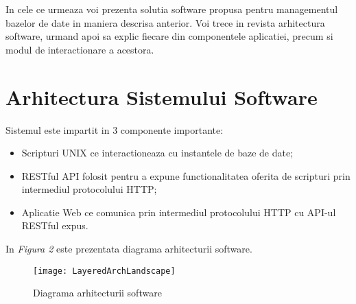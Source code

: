 In cele ce urmeaza voi prezenta solutia software propusa pentru managementul bazelor de date in maniera descrisa anterior. Voi trece in revista arhitectura software, urmand apoi sa explic fiecare din componentele aplicatiei, precum si modul de interactionare a acestora.
\\

\section{Arhitectura Sistemului Software}
Sistemul este impartit in 3 componente importante:
\begin{itemize}
\item Scripturi UNIX ce interactioneaza cu instantele de baze de date;
\item RESTful API folosit pentru a expune functionalitatea oferita de scripturi prin intermediul protocolului HTTP;
\item Aplicatie Web ce comunica prin intermediul protocolului HTTP cu API-ul RESTful expus.
\end{itemize}
In \textit{Figura 2} este prezentata diagrama arhitecturii software.
\begin{figure}[h]
	\centering
	\texttt{[image: LayeredArchLandscape]}
    \caption{Diagrama arhitecturii software}
    \label{fig:LayeredArchPortrait}
\end{figure}
\newpage
